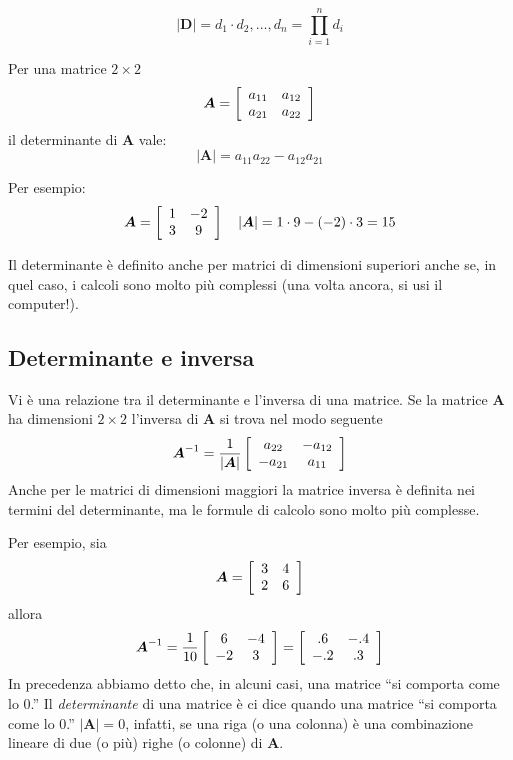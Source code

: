 $$
|\boldsymbol{D}| =  d_1 \cdot d_2, \dots, d_n = \prod_{i=1}^{n}d_i
$$

Per una matrice $2 \times 2$
\begin{displaymath}
\boldsymbol{A} =  \left[ \begin{array}{c c}
a_{11}& a_{12} \\
a_{21} & a_{22} \end{array} \right]
\end{displaymath}
il determinante di $\boldsymbol{A}$ vale:
\[
 |\boldsymbol{A}| =  a_{11}a_{22}-a_{12}a_{21}
\]

 Per esempio:
\[
 \boldsymbol{A} = \left[ \begin{array}{c c}
1 & -2 \\
3 & 9
\end{array}
 \right] \quad |\boldsymbol{A}| = 1\cdot 9 - (-2) \cdot  3 = 15
\]

 Il determinante {\`e} definito anche per matrici di
dimensioni superiori anche se, in quel caso, i calcoli sono molto
pi{\`u} complessi (una volta ancora, si usi il computer!).

\subsection{Determinante e inversa}

 Vi {\`e} una relazione tra il determinante e l'inversa di
    una matrice.
     Se la matrice $\boldsymbol{A}$ ha dimensioni $2 \times
    2$ l'inversa di $\boldsymbol{A}$ si trova nel modo seguente
\[
\boldsymbol{A}^{-1} = \frac{1}{|\boldsymbol{A}|} \left[
\begin{array}{c c}
a_{22} & -a_{12} \\
-a_{21} & a_{11}
\end{array}
 \right]
\]
 Anche per le matrici di dimensioni maggiori la matrice
    inversa {\`e} definita nei termini del determinante, ma le
    formule di calcolo sono molto pi{\`u} complesse.

 Per esempio, sia
\begin{displaymath}
\boldsymbol{A} = \left[ \begin{array}{c c}
3 & 4 \\
2 & 6
\end{array}
\right]
\end{displaymath}
allora
\begin{displaymath}
\boldsymbol{A}^{-1} = \frac{1}{10} \left[
\begin{array}{c c}
6 & -4 \\
-2 & 3
\end{array}
\right]= \left[ \begin{array}{c c}
.6 & -.4 \\
-.2 & .3
\end{array}
 \right]
\end{displaymath}
 In precedenza abbiamo detto che, in alcuni casi, una
     matrice ``si comporta come lo 0.''
 Il \emph{determinante} di una matrice {\`e} ci dice quando una
     matrice ``si comporta come lo 0.''
$|\boldsymbol{A}| = 0$, infatti, se una riga (o una colonna) {\`e}
    una combinazione lineare di due (o pi{\`u}) righe (o colonne) di $\boldsymbol{A}$.

